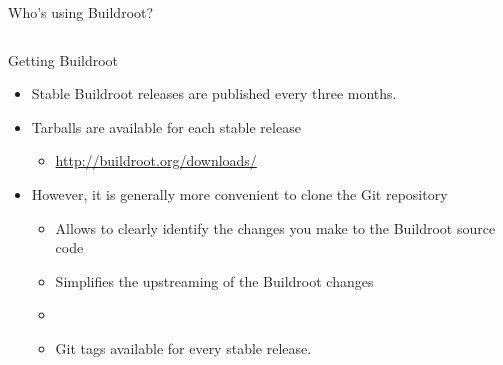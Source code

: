 \begin{frame}{Who's using Buildroot?}
\begin{columns}
  \end{columns}
\end{frame}

\begin{frame}{Getting Buildroot}
  \begin{itemize}
  \item Stable Buildroot releases are published every three months.
  \item Tarballs are available for each stable release
    \begin{itemize}
    \item \url{http://buildroot.org/downloads/}
    \end{itemize}
  \item However, it is generally more convenient to clone the Git
    repository
    \begin{itemize}
    \item Allows to clearly identify the changes you make to the
      Buildroot source code
    \item Simplifies the upstreaming of the Buildroot changes
    \item {}
    \item Git tags available for every stable release.
    \end{itemize}
  \end{itemize}
\end{frame}

